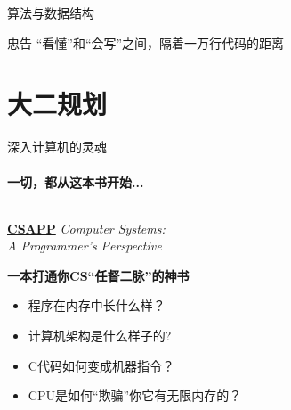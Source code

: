 \documentclass{beamer}
\newcommand{\hrefcol}[2]{\textcolor{cyan}{\href{#1}{#2}}}
\begin{document}
\begin{frame}{算法与数据结构}
    \begin{alertblock}{忠告}
        “看懂”和“会写”之间，隔着一万行代码的距离
    \end{alertblock}
\end{frame}


\section{大二规划}
\begin{frame}{深入计算机的灵魂}
    \framesubtitle{一切，都从这本书开始...}
    
    \begin{columns}[T]
        \begin{column}{0.5\textwidth}
             \hrefcol{https://www.cs.cmu.edu/~213/}{\huge \textbf{CSAPP}}
            \large \textit{Computer Systems: \\ A Programmer's Perspective}

            \begin{center}
                \Large \textbf{一本打通你CS“任督二脉”的神书}
            \end{center}
            \begin{itemize}
                    \small \item 程序在内存中长什么样？
                    \item 计算机架构是什么样子的?
                    \item C代码如何变成机器指令？
                    \item CPU是如何“欺骗”你它有无限内存的？
            \end{itemize}
            
        \end{column}
        

\end{columns}
\end{frame}
\end{document}

